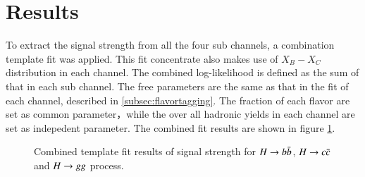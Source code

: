  \section{Results}\label{sec:results}
 To extract the signal strength from all the four sub channels, a combination template fit was applied.
 This fit concentrate also makes use of $X_B-X_C$ distribution in each channel. 
 The combined log-likelihood is defined as the sum of that in each sub channel.
 The free parameters are the same as that in the fit of each channel, described in \ref{subsec:flavortagging}. 
 The fraction of each flavor are set as common parameter，while the over all hadronic yields in each channel are set as indepedent parameter. The combined fit results are shown in figure \ref{fig:combined_fit}. 
 
\begin{figure}[!htpb]
\label{fig:combined_fit}
\centering
{}
\caption{Combined template fit results of signal strength for $H\rightarrow b\bar{b}$, $H\rightarrow c\bar{c}$ and $H\rightarrow gg$ process.}
\end{figure}
 
